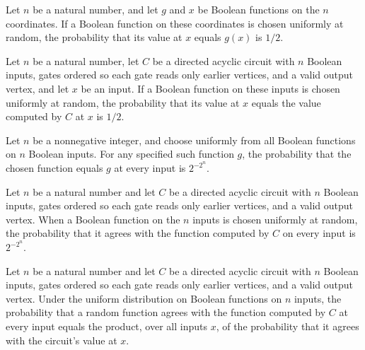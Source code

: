 \begin{theorem}
\label{BoolCircuit.prob_apply_eq}
\leanok
{}
Let $n$ be a natural number, and let $g$ and $x$ be Boolean functions on the $n$
coordinates. If a Boolean function on these coordinates is chosen uniformly at random,
the probability that its value at $x$ equals $g(x)$ is $1/2$.
\end{theorem}

\begin{theorem}
\label{BoolCircuit.prob_eval_eq_apply}
\leanok
{}
Let $n$ be a natural number, let $C$ be a directed acyclic circuit with $n$ Boolean
inputs, gates ordered so each gate reads only earlier vertices, and a valid output
vertex, and let $x$ be an input. If a Boolean function on these inputs is chosen
uniformly at random, the probability that its value at $x$ equals the value computed by
$C$ at $x$ is $1/2$.
\end{theorem}

\begin{theorem}
\label{BoolCircuit.prob_forall_eq}
\leanok
{}
Let $n$ be a nonnegative integer, and choose uniformly from all Boolean functions on $n$
Boolean inputs. For any specified such function $g$, the probability that the chosen
function equals $g$ at every input is $2^{-2^n}$.
\end{theorem}

\begin{theorem}
\label{BoolCircuit.prob_computes}
\leanok
{}
Let $n$ be a natural number and let $C$ be a directed acyclic circuit with $n$ Boolean
inputs, gates ordered so each gate reads only earlier vertices, and a valid output
vertex. When a Boolean function on the $n$ inputs is chosen uniformly at random, the
probability that it agrees with the function computed by $C$ on every input is
$2^{-2^n}$.
\end{theorem}

\begin{theorem}
\label{BoolCircuit.prob_computes_eq_prod}
\leanok
{}
Let $n$ be a natural number and let $C$ be a directed acyclic circuit with $n$ Boolean
inputs, gates ordered so each gate reads only earlier vertices, and a valid output
vertex. Under the uniform distribution on Boolean functions on $n$ inputs, the
probability that a random function agrees with the function computed by $C$ at every
input equals the product, over all inputs $x$, of the probability that it agrees with
the circuit's value at $x$.
\end{theorem}

